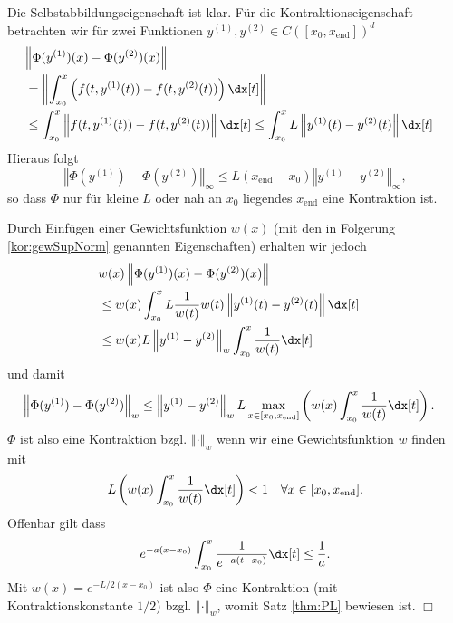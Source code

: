 \documentclass[
]{mycourse}
\theoremstyle{mythm}
\theoremstyle{break}
\newcommand{\norm}[1]{\left\Vert#1\right\Vert}		%
\begin{document}
Die Selbstabbildungseigenschaft ist klar. Für die Kontraktionseigenschaft betrachten wir
für zwei Funktionen $y^{(1)},y^{(2)}\in C([x_0,x_\mathrm{end}])^d$
\begin{align*}
\lefteqn{\norm{\Phi(y^{(1)})(x)-\Phi(y^{(2)})(x)}}\\
&=\norm{ \int_{x_0}^x \left( f(t,y^{(1)}(t)) - f(t,y^{(2)}(t)) \right)\dx[t]}\\
&\leq \int_{x_0}^x \norm{ f(t,y^{(1)}(t)) - f(t,y^{(2)}(t)) } \dx[t]
\leq \int_{x_0}^x L \norm{ y^{(1)}(t) - y^{(2)}(t) } \dx[t]
\end{align*}
Hieraus folgt 
\[
\norm{\Phi(y^{(1)}) - \Phi(y^{(2)}) }_\infty  \leq L (x_\mathrm{end}-x_0) \norm{y^{(1)} - y^{(2)}}_\infty,
\]
so dass $\Phi$ nur für kleine $L$ oder nah an $x_0$ liegendes $x_\mathrm{end}$ eine Kontraktion ist.

Durch Einfügen einer Gewichtsfunktion $w(x)$ (mit den in Folgerung \ref{kor:gewSupNorm} genannten Eigenschaften) erhalten wir jedoch
\begin{align*}
\lefteqn{w(x) \norm{\Phi(y^{(1)})(x)-\Phi(y^{(2)})(x)}}\\
&\leq w(x) \int_{x_0}^x L \frac{1}{w(t)} w(t) \norm{ y^{(1)}(t) - y^{(2)}(t) } \dx[t]\\
&\leq w(x) L \norm{y^{(1)} - y^{(2)}}_w \int_{x_0}^x \frac{1}{w(t)} \dx[t]
\end{align*}
und damit
\begin{align*}
\norm{\Phi(y^{(1)}) - \Phi(y^{(2)}) }_w&\leq \norm{y^{(1)} - y^{(2)}}_w
L \max_{x\in [x_0,x_\mathrm{end}]} \left(w(x) \int_{x_0}^x \frac{1}{w(t)} \dx[t]\right).
\end{align*}
$\Phi$ ist also eine Kontraktion bzgl. $\norm{\cdot}_w$ wenn wir eine Gewichtsfunktion 
$w$ finden mit
\[
L\left(w(x) \int_{x_0}^x \frac{1}{w(t)} \dx[t]\right)<1 \quad \forall x\in [x_0,x_\mathrm{end}].
\]
Offenbar gilt dass 
\[
e^{-a(x-x_0)} \int_{x_0}^x \frac{1}{e^{-a(t-x_0)}} \dx[t]\leq\frac{1}{a}.
\]
Mit $w(x)=e^{- L/2(x-x_0)}$ ist also $\Phi$ eine Kontraktion (mit Kontraktionskonstante $1/2$) 
bzgl. $\norm{\cdot}_w$, womit Satz \ref{thm:PL} bewiesen ist. \hfill $\Box$
\end{document}
